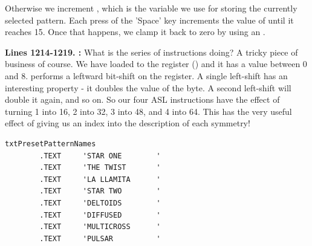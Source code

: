 Otherwise we increment , which is the variable we use for storing the currently selected pattern.
Each press of the 'Space' key increments the value of  until it reaches 15. Once that happens, we 
clamp it back to zero by using an .

\textbf{Lines 1214-1219. :} What is the series of  instructions doing? A tricky
piece of business of course. We have loaded  to the  register () and it has a value between 0 and 8.
 performs a leftward bit-shift on the  register. A single left-shift has an interesting property - it doubles the
value of the byte. A second left-shift will double it again, and so on. So our four {ASL} instructions have the effect of turning 1 into
16, 2 into 32, 3 into 48, and 4 into 64. This has the very useful effect of giving us an index into the description of each symmetry!

\begin{lstlisting}
txtPresetPatternNames
        .TEXT     'STAR ONE        '
        .TEXT     'THE TWIST       '
        .TEXT     'LA LLAMITA      '
        .TEXT     'STAR TWO        '
        .TEXT     'DELTOIDS        '
        .TEXT     'DIFFUSED        '
        .TEXT     'MULTICROSS      '
        .TEXT     'PULSAR          '
\end{lstlisting}

